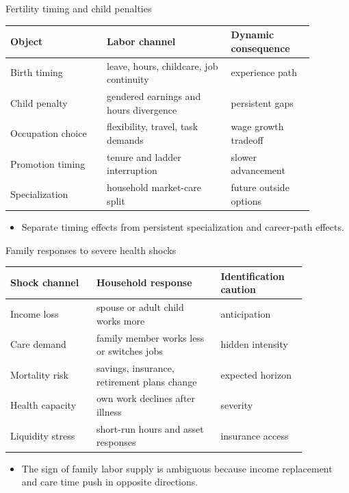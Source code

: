\documentclass[aspectratio=169,11pt]{beamer}
\begin{document}
\begin{frame}{Fertility timing and child penalties}
\small
\begin{tabular}{p{0.28\linewidth} p{0.36\linewidth} p{0.24\linewidth}}
\toprule
Object & Labor channel & Dynamic consequence \\
\midrule
Birth timing & leave, hours, childcare, job continuity & experience path \\
Child penalty & gendered earnings and hours divergence & persistent gaps \\
Occupation choice & flexibility, travel, task demands & wage growth tradeoff \\
Promotion timing & tenure and ladder interruption & slower advancement \\
Specialization & household market-care split & future outside options \\
\bottomrule
\end{tabular}
\vspace{0.3cm}
\begin{itemize}
    \item Separate timing effects from persistent specialization and career-path effects.
\end{itemize}
\end{frame}

\begin{frame}{Family responses to severe health shocks}
\small
\begin{tabular}{p{0.25\linewidth} p{0.36\linewidth} p{0.25\linewidth}}
\toprule
Shock channel & Household response & Identification caution \\
\midrule
Income loss & spouse or adult child works more & anticipation \\
Care demand & family member works less or switches jobs & hidden intensity \\
Mortality risk & savings, insurance, retirement plans change & expected horizon \\
Health capacity & own work declines after illness & severity \\
Liquidity stress & short-run hours and asset responses & insurance access \\
\bottomrule
\end{tabular}
\vspace{0.25cm}
\begin{itemize}
    \item The sign of family labor supply is ambiguous because income replacement and care time push in opposite directions.
\end{itemize}
\end{frame}
\end{document}

